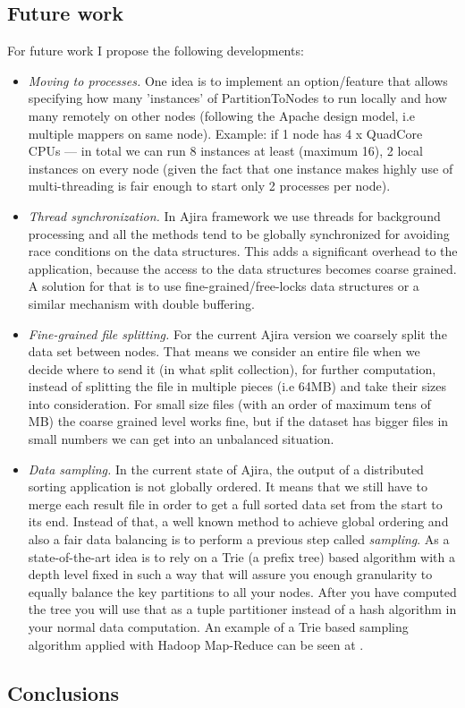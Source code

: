 \subsection{Future work}

For future work I propose the following developments:

\begin{itemize}
	\item \textit{Moving to processes.} One idea is to implement an option/feature that allows specifying how many 'instances' of PartitionToNodes to run locally and how many remotely on other nodes (following the Apache design model, i.e multiple mappers on same node). Example: if 1 node has 4 x QuadCore CPUs --- in total we can run 8 instances at least (maximum 16), 2 local instances on every node (given the fact that one instance makes highly use of multi-threading is fair enough to start only 2 processes per node).
	\item \textit{Thread synchronization.} In Ajira framework we use threads for background processing and all the methods tend to be globally synchronized for avoiding race conditions on the data structures. This adds a significant overhead to the application, because the access to the data structures becomes coarse grained. A solution for that is to use fine-grained/free-locks data structures or a similar mechanism with double buffering. 
	\item \textit{Fine-grained file splitting.} For the current Ajira version we coarsely split the data set between nodes. That means we consider an entire file when we decide where to send it (in what split collection), for further computation, instead of splitting the file in multiple pieces (i.e 64MB) and take their sizes into consideration. For small size files (with an order of maximum tens of MB) the coarse grained level works fine, but if the dataset has bigger files in small numbers we can get into an unbalanced situation.
	\item \textit{Data sampling.} In the current state of Ajira, the output of a distributed sorting application is not globally ordered. It means that we still have to merge each result file in order to get a full sorted data set from the start to its end. Instead of that, a well known method to achieve global ordering and also a fair data balancing is to perform a previous step called \textit{sampling}. As a state-of-the-art idea is to rely on a Trie (a prefix tree) based algorithm with a depth level fixed in such a way that will assure you enough granularity to equally balance the key partitions to all your nodes. After you have computed the tree you will use that as a tuple partitioner instead of a hash algorithm in your normal data computation. An example of a Trie based sampling algorithm applied with Hadoop Map-Reduce can be seen at \cite{terasort}.
\end{itemize}

\subsection{Conclusions}
